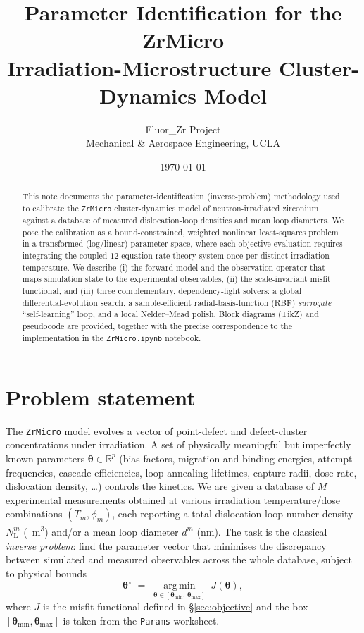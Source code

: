 \documentclass[11pt]{article}
\title{\bf Parameter Identification for the ZrMicro\\
Irradiation-Microstructure Cluster-Dynamics Model}
\author{Fluor\_Zr Project \\ Mechanical \& Aerospace Engineering, UCLA}
\date{\today}
\newcommand{\R}{\mathbb{R}}
\newcommand{\param}{\bm{\theta}}
\newcommand{\NL}{N_{\mathrm{L}}}
\newcommand{\dpa}{\phi}
\begin{document}
\maketitle

\begin{abstract}
This note documents the parameter-identification (inverse-problem) methodology
used to calibrate the \texttt{ZrMicro} cluster-dynamics model of neutron-irradiated
zirconium against a database of measured dislocation-loop densities and mean loop
diameters. We pose the calibration as a bound-constrained, weighted nonlinear
least-squares problem in a transformed (log/linear) parameter space, where each
objective evaluation requires integrating the coupled $12$-equation rate-theory
system once per distinct irradiation temperature. We describe (i) the forward
model and the observation operator that maps simulation state to the experimental
observables, (ii) the scale-invariant misfit functional, and (iii) three
complementary, dependency-light solvers: a global differential-evolution search,
a sample-efficient radial-basis-function (RBF) \emph{surrogate} ``self-learning''
loop, and a local Nelder--Mead polish. Block diagrams (TikZ) and pseudocode are
provided, together with the precise correspondence to the implementation in the
\texttt{ZrMicro.ipynb} notebook.
\end{abstract}

\tableofcontents

\section{Problem statement}
The \texttt{ZrMicro} model evolves a vector of point-defect and defect-cluster
concentrations under irradiation. A set of physically meaningful but imperfectly
known parameters $\param\in\R^{p}$ (bias factors, migration and binding energies,
attempt frequencies, cascade efficiencies, loop-annealing lifetimes, capture
radii, dose rate, dislocation density, \dots) controls the kinetics. We are given
a database of $M$ experimental measurements obtained at various irradiation
temperature/dose combinations $(T_m,\dpa_m)$, each reporting a total dislocation-loop
number density $\NL^{m}$ (\si{\per\cubic\metre}) and/or a mean loop diameter
$d^{m}$ (\si{\nano\metre}). The task is the classical \emph{inverse problem}:
find the parameter vector that minimises the discrepancy between simulated and
measured observables across the whole database, subject to physical bounds
\begin{equation}
  \param^{\star}
  \;=\;\operatorname*{arg\,min}_{\param\in[\param_{\min},\,\param_{\max}]}
  \; J(\param),
  \label{eq:problem}
\end{equation}
where $J$ is the misfit functional defined in \S\ref{sec:objective} and the box
$[\param_{\min},\param_{\max}]$ is taken from the \texttt{Params} worksheet.
\end{document}
